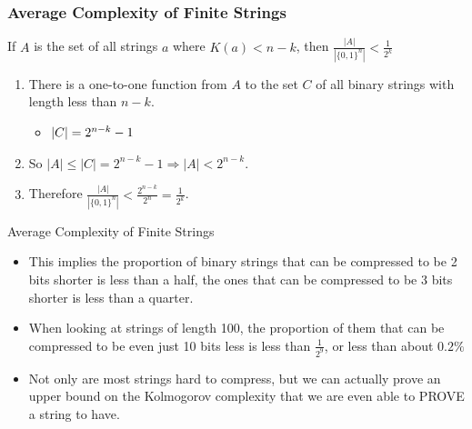 \documentclass[aspectratio=169]{beamer}
\begin{document}
\begin{frame}
  \frametitle{Average Complexity of Finite Strings}
  \begin{thrm}
    If $A$ is the set of all strings $a$ where $K(a) < n - k$, then $\frac{|A|}{|\{0, 1\}^n|} < \frac{1}{2^k}$ 
  \end{thrm}
  \pause
  \begin{pf}
    \begin{enumerate}
        \item There is a one-to-one function from $A$ to the set $C$ of all binary strings with length less than $n - k$.
        \begin{itemize}
            \item $\abs{C} = 2^{n - k} - 1$
        \end{itemize} \pause
        \item So $|A| \leq |C| = 2^{n-k}-1 \Rightarrow |A| < 2^{n-k}$. \pause
        \item Therefore $\frac{|A|}{|\{0,1\}^n|} < \frac{2^{n-k}}{2^n} = \frac{1}{2^k}$. 
    \end{enumerate}
  \end{pf}
\end{frame}

\begin{frame}{Average Complexity of Finite Strings}
  
  \begin{itemize}
    \item This implies the proportion of binary strings that can be compressed to be 2 bits shorter is less than a half, the ones that can be compressed to be 3 bits shorter is less than a quarter. \pause
    \item When looking at strings of length 100, the proportion of them that can be compressed to be even just 10 bits less is less than $\frac{1}{2^9}$, or less than about $0.2\%$ \pause
    \item Not only are most strings hard to compress, but we can actually prove an upper bound on the Kolmogorov complexity that we are even able to PROVE a string to have.
  \end{itemize}
\end{frame}
\end{document}
